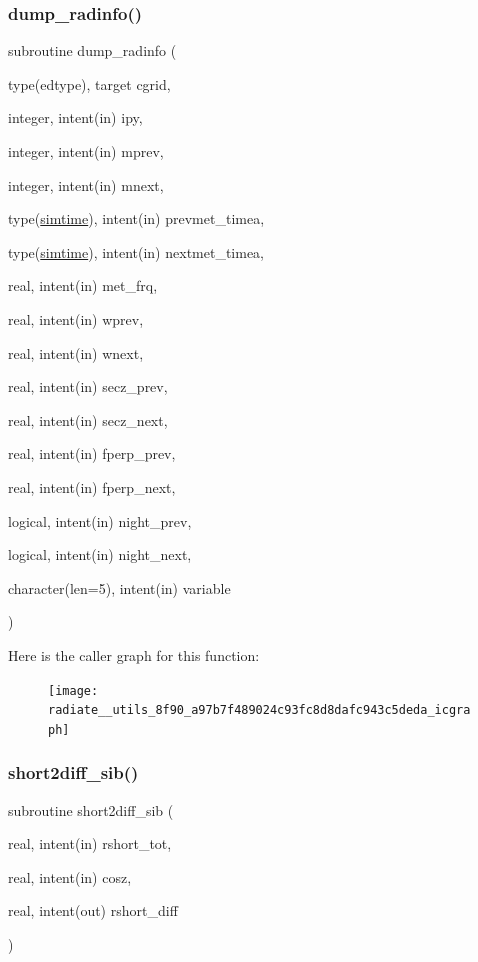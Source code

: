 \subsubsection{\texorpdfstring{dump\+\_\+radinfo()}{dump\_radinfo()}}
{\footnotesize\ttfamily subroutine dump\+\_\+radinfo (\begin{DoxyParamCaption}\item[{type(edtype), target}]{cgrid,  }\item[{integer, intent(in)}]{ipy,  }\item[{integer, intent(in)}]{mprev,  }\item[{integer, intent(in)}]{mnext,  }\item[{type(\hyperlink{structed__misc__coms_1_1simtime}{simtime}), intent(in)}]{prevmet\+\_\+timea,  }\item[{type(\hyperlink{structed__misc__coms_1_1simtime}{simtime}), intent(in)}]{nextmet\+\_\+timea,  }\item[{real, intent(in)}]{met\+\_\+frq,  }\item[{real, intent(in)}]{wprev,  }\item[{real, intent(in)}]{wnext,  }\item[{real, intent(in)}]{secz\+\_\+prev,  }\item[{real, intent(in)}]{secz\+\_\+next,  }\item[{real, intent(in)}]{fperp\+\_\+prev,  }\item[{real, intent(in)}]{fperp\+\_\+next,  }\item[{logical, intent(in)}]{night\+\_\+prev,  }\item[{logical, intent(in)}]{night\+\_\+next,  }\item[{character(len=5), intent(in)}]{variable }\end{DoxyParamCaption})}

Here is the caller graph for this function\+:
\nopagebreak
\begin{figure}[H]
\begin{center}
\leavevmode
\texttt{[image: radiate\_\_utils\_8f90\_a97b7f489024c93fc8d8dafc943c5deda\_icgraph]}
\end{center}
\end{figure}
\mbox{\label{radiate__utils_8f90_a51dd2852d7a8314141edfffde24dd0af}} 
\subsubsection{\texorpdfstring{short2diff\+\_\+sib()}{short2diff\_sib()}}
{\footnotesize\ttfamily subroutine short2diff\+\_\+sib (\begin{DoxyParamCaption}\item[{real, intent(in)}]{rshort\+\_\+tot,  }\item[{real, intent(in)}]{cosz,  }\item[{real, intent(out)}]{rshort\+\_\+diff }\end{DoxyParamCaption})}

